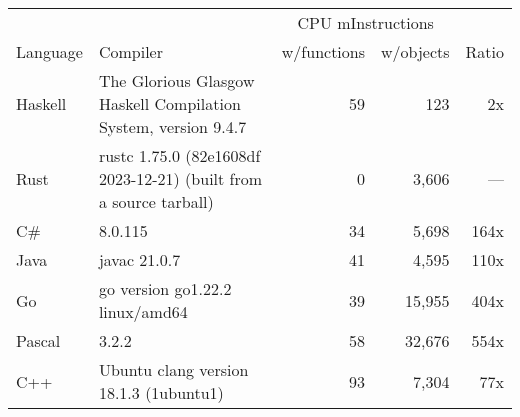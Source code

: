 \documentclass{article}
\begin{document}
      \begin{tabularx}{\linewidth}{lXrrr}
      \toprule
        & & \multicolumn{2}{c}{CPU mInstructions} & \\
        Language & Compiler & w/functions & w/objects & Ratio \\
      \midrule
    Haskell & The Glorious Glasgow Haskell Compilation System, version 9.4.7 & 59 & 123 & 2x \\
Rust & rustc 1.75.0 (82e1608df 2023-12-21) (built from a source tarball) & 0 & 3,606 & --- \\
C\# & 8.0.115 & 34 & 5,698 & 164x \\
Java & javac 21.0.7 & 41 & 4,595 & 110x \\
Go & go version go1.22.2 linux/amd64 & 39 & 15,955 & 404x \\
Pascal & 3.2.2 & 58 & 32,676 & 554x \\
C++ & Ubuntu clang version 18.1.3 (1ubuntu1) & 93 & 7,304 & 77x \\

      \bottomrule
      \end{tabularx}
      
\end{document}
